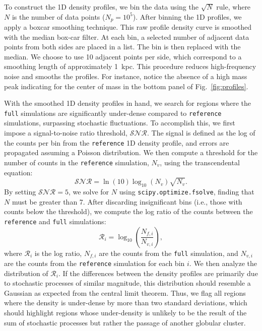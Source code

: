 \documentclass{aa}
\begin{document}
\begin{appendix}
    To construct the 1D density profiles, we bin the data using the $\sqrt{N}$ rule, where $N$ is the number of data points ($N_p = 10^5$). After binning the 1D profiles, we apply a boxcar smoothing technique. This raw profile density curve is smoothed with the median box-car filter. At each bin, a selected number of adjacent data points from both sides are placed in a list. The bin is then replaced with the median. We choose to use 10 adjacent points per side, which correspond to a smoothing length of approximately 1~kpc. This procedure reduces high-frequency noise and smooths the profiles. For instance, notice the absence of a high mass peak indicating for the center of mass in the bottom panel of Fig.~\ref{fig:profiles}.

    With the smoothed 1D density profiles in hand, we search for regions where the \texttt{full} simulations are significantly under-dense compared to \texttt{reference} simulations, surpassing stochastic fluctuations. To accomplish this, we first impose a signal-to-noise ratio threshold, $\mathcal{SNR}$. The signal is defined as the log of the counts per bin from the \texttt{reference} 1D density profile, and errors are propagated assuming a Poisson distribution. We then compute a threshold for the number of counts in the \texttt{reference} simulation, $N_v$, using the transcendental equation:
    \begin{equation}
        \mathcal{SNR} = \ln(10) \log_{10}\left(N_v\right) \sqrt{N_v}.
      \end{equation} \label{eq:density_threshold}
    By setting $\mathcal{SNR} = 5$, we solve for $N$ using \texttt{scipy.optimize.fsolve}, finding that $N$ must be greater than 7. After discarding insignificant bins (i.e., those with counts below the threshold), we compute the log ratio of the counts between the \texttt{reference} and \texttt{full} simulations:
    \begin{equation}
        \mathcal{R}_i = \log_{10}\left(\frac{N_{f,i}}{N_{v,i}}\right),
      \end{equation}
    where $\mathcal{R}_i$ is the log ratio, $N_{f,i}$ are the counts from the \texttt{full} simulation, and $N_{v,i}$ are the counts from the \texttt{reference} simulation for each bin $i$. We then analyze the distribution of $\mathcal{R}_i$. If the differences between the density profiles are primarily due to stochastic processes of similar magnitude, this distribution should resemble a Gaussian as expected from the central limit theorem. Thus, we flag all regions where the density is under-dense by more than two standard deviations, which should highlight regions whose under-density is unlikely to be the result of the sum of stochastic processes but rather the passage of another globular cluster. 


\end{appendix}
\end{document}
